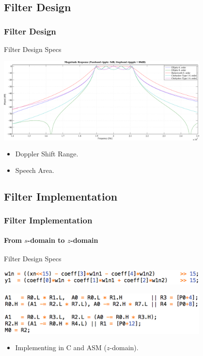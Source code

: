 \subsection{Filter Design}
\begin{frame} \frametitle{Filter Design}
    \begin{block}{Filter Design Specs}    
        \begin{center}
            \includegraphics[width=0.8\textwidth]{img/filter2_frq_res}
        \end{center}
        \begin{itemize}
            \item Doppler Shift Range.
            \item Speech Area.
        \end{itemize}
    \end{block}
\end{frame}

\subsection{Filter Implementation}
\begin{frame} \frametitle{Filter Implementation}
    \framesubtitle{From $s$-domain to $z$-domain}
    \begin{block}{Filter Design Specs}    
        \begin{center}
            \includegraphics[width=0.8\textwidth]{img/filter_C_cascade}
        \end{center}
        \begin{center}
            \includegraphics[width=0.8\textwidth]{img/filter_asm_cascade}
        \end{center}
        \begin{itemize}
            \item Implementing in C and ASM ($z$-domain).
        \end{itemize}
    \end{block}
\end{frame}

